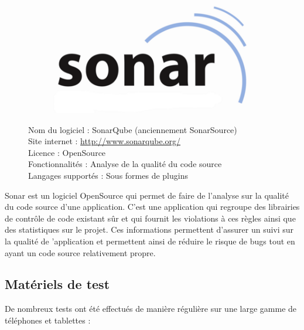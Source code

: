 \documentclass{report}
\begin{document}
\begin{figure}[h]
\begin{figure}
\includegraphics{images/sonar_logo}
\end{figure}
\noindent
Nom du logiciel : SonarQube (anciennement SonarSource)\\
Site internet : \url{http://www.sonarqube.org/}\\
Licence : OpenSource\\
Fonctionnalités : Analyse de la qualité du code source\\
Langages supportés : Sous formes de plugins\\
\bigskip
\end{figure}
\noindent
Sonar est un logiciel OpenSource qui permet de faire de l’analyse sur
la qualité du code source d’une application. C’est une application qui
regroupe des librairies de contrôle de code existant sûr et qui fournit
les violations à ces règles ainsi que des statistiques sur le projet.
Ces informations permettent d’assurer un suivi sur la qualité de
’application et permettent ainsi de réduire le risque de bugs tout en
ayant un code source relativement propre.

\subsection{Matériels de test}

De nombreux tests ont été effectués de manière régulière sur une large
gamme de téléphones et tablettes :
\end{document}

